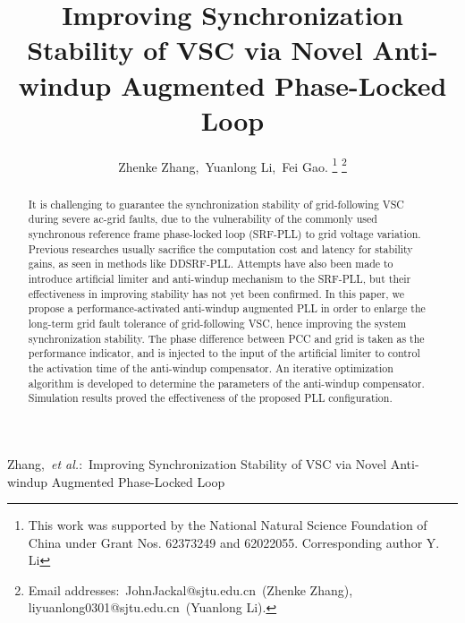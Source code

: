 \documentclass[10pt,final,journal,twoside]{IEEEtran}
\begin{document}
\title{Improving Synchronization Stability of VSC via Novel Anti-windup Augmented Phase-Locked Loop}
\author{Zhenke Zhang,~Yuanlong Li,~Fei Gao.
\thanks{This work was supported by the National Natural Science Foundation of China under Grant Nos. 62373249 and 62022055. Corresponding author
Y. Li}
\thanks{Email addresses:~JohnJackal@sjtu.edu.cn~(Zhenke Zhang),\\liyuanlong0301@sjtu.edu.cn~(Yuanlong Li).}}
{Zhang,~\MakeLowercase{\textit{et al.}}:~Improving Synchronization Stability of VSC via Novel Anti-windup Augmented Phase-Locked Loop}
\maketitle

\begin{abstract}
It is challenging to guarantee the synchronization stability of grid-following VSC during severe ac-grid faults, due to the vulnerability of the commonly used synchronous reference frame phase-locked
loop (SRF-PLL) to grid voltage variation. Previous researches usually sacrifice the computation cost and latency for stability gains, as seen in methods like DDSRF-PLL. Attempts have also been made to introduce
artificial limiter and anti-windup mechanism to the SRF-PLL, but their effectiveness in improving stability has not yet been confirmed. In this paper, we propose a performance-activated anti-windup augmented PLL
in order to enlarge the long-term grid fault tolerance of grid-following VSC, hence improving the system synchronization stability. The phase difference between PCC and grid is taken as the performance
indicator, and is injected to the input of the artificial limiter to control the activation time of the anti-windup compensator. An iterative optimization algorithm is developed to determine the parameters
of the anti-windup compensator. Simulation results proved the effectiveness of the proposed PLL configuration.
\end{abstract}
\end{document}
